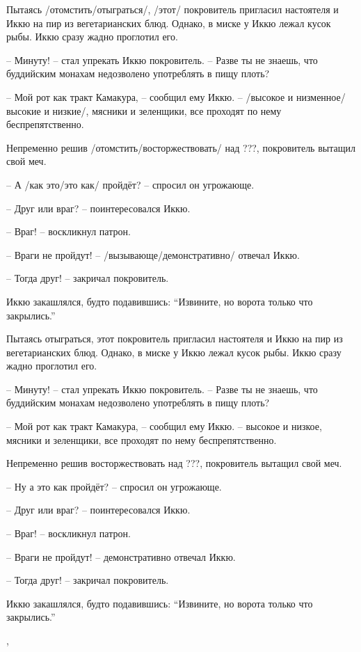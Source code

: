 \begin{ver}
Пытаясь /отомстить/отыграться/, /этот/ покровитель
пригласил настоятеля и Иккю на пир из вегетарианских блюд. Однако, в
миске у Иккю лежал кусок рыбы. Иккю сразу жадно проглотил его.

-- Минуту! -- стал упрекать Иккю покровитель. -- Разве ты не знаешь,
что буддийским монахам недозволено употреблять в пищу плоть?

-- Мой рот как тракт Камакура, -- сообщил ему Иккю. -- /высокое и
низменное/высокие и низкие/, мясники и зеленщики, все проходят по нему
беспрепятственно.

Непременно решив /отомстить/восторжествовать/
над ???,
покровитель вытащил свой меч.

-- А /как это/это как/ пройдёт? -- спросил он угрожающе.

-- Друг или враг? -- поинтересовался Иккю.

-- Враг! -- воскликнул патрон.

-- Враги не пройдут! -- /вызывающе/демонстративно/ отвечал Иккю.

-- Тогда друг! -- закричал покровитель.

Иккю закашлялся, будто подавившись: ``Извините, но ворота только что закрылись.''
\end{ver}
\begin{ver}[1]
Пытаясь отыграться, этот покровитель
пригласил настоятеля и Иккю на пир из вегетарианских блюд. Однако, в
миске у Иккю лежал кусок рыбы. Иккю сразу жадно проглотил его.

-- Минуту! -- стал упрекать Иккю покровитель. -- Разве ты не знаешь,
что буддийским монахам недозволено употреблять в пищу плоть?

-- Мой рот как тракт Камакура, -- сообщил ему Иккю. -- высокое и
низкое, мясники и зеленщики, все проходят по нему
беспрепятственно.

Непременно решив восторжествовать
над ???,
покровитель вытащил свой меч.

-- Ну а это как пройдёт? -- спросил он угрожающе.

-- Друг или враг? -- поинтересовался Иккю.

-- Враг! -- воскликнул патрон.

-- Враги не пройдут! -- демонстративно отвечал Иккю.

-- Тогда друг! -- закричал покровитель.

Иккю закашлялся, будто подавившись: ``Извините, но ворота только что
закрылись.''

\end{ver}
\sep

